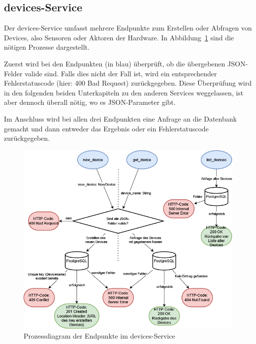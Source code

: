     \subsection{devices-Service}
        Der devices-Service umfasst mehrere Endpunkte zum Erstellen oder Abfragen von Devices, also Sensoren oder Aktoren der Hardware.
        In Abbildung~\ref{fig:backend-service-devices} sind die nötigen Prozesse dargestellt.

        Zuerst wird bei den Endpunkten (in blau) überprüft, ob die übergebenen JSON-Felder valide sind.
        Falls dies nicht der Fall ist, wird ein entsprechender Fehlerstatuscode (hier: 400 Bad Request) zurückgegeben.
        Diese Überprüfung wird in den folgenden beiden Unterkapiteln zu den anderen Services weggelassen, ist aber dennoch überall nötig, wo es JSON-Parameter gibt.

        Im Anschluss wird bei allen drei Endpunkten eine Anfrage an die Datenbank gemacht und dann entweder das Ergebnis oder ein Fehlerstatuscode zurückgegeben.

        \begin{figure}[H]
            \includegraphics[width=0.95\linewidth]{images/prozessdiagramm_backend_devices.drawio.png}
            \centering
            \caption{Prozessdiagram der Endpunkte im devices-Service}
            \label{fig:backend-service-devices}
        \end{figure}

